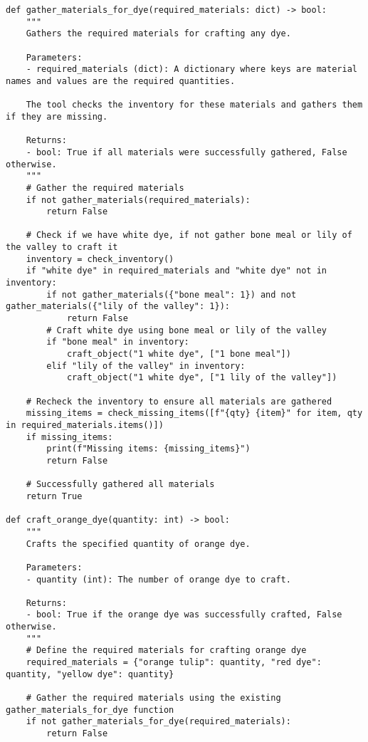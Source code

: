 \begin{tcolorbox}[title=Tools for TextCraft, width=\textwidth,top=0mm, breakable]
\begin{Verbatim}[breaklines=true, breakanywhere=true, fontsize=\footnotesize]
def gather_materials_for_dye(required_materials: dict) -> bool:
    """
    Gathers the required materials for crafting any dye.
    
    Parameters:
    - required_materials (dict): A dictionary where keys are material names and values are the required quantities.
    
    The tool checks the inventory for these materials and gathers them if they are missing.
    
    Returns:
    - bool: True if all materials were successfully gathered, False otherwise.
    """
    # Gather the required materials
    if not gather_materials(required_materials):
        return False
    
    # Check if we have white dye, if not gather bone meal or lily of the valley to craft it
    inventory = check_inventory()
    if "white dye" in required_materials and "white dye" not in inventory:
        if not gather_materials({"bone meal": 1}) and not gather_materials({"lily of the valley": 1}):
            return False
        # Craft white dye using bone meal or lily of the valley
        if "bone meal" in inventory:
            craft_object("1 white dye", ["1 bone meal"])
        elif "lily of the valley" in inventory:
            craft_object("1 white dye", ["1 lily of the valley"])
    
    # Recheck the inventory to ensure all materials are gathered
    missing_items = check_missing_items([f"{qty} {item}" for item, qty in required_materials.items()])
    if missing_items:
        print(f"Missing items: {missing_items}")
        return False
    
    # Successfully gathered all materials
    return True

def craft_orange_dye(quantity: int) -> bool:
    """
    Crafts the specified quantity of orange dye.
    
    Parameters:
    - quantity (int): The number of orange dye to craft.
    
    Returns:
    - bool: True if the orange dye was successfully crafted, False otherwise.
    """
    # Define the required materials for crafting orange dye
    required_materials = {"orange tulip": quantity, "red dye": quantity, "yellow dye": quantity}
    
    # Gather the required materials using the existing gather_materials_for_dye function
    if not gather_materials_for_dye(required_materials):
        return False
    

\end{Verbatim}
\end{tcolorbox}
